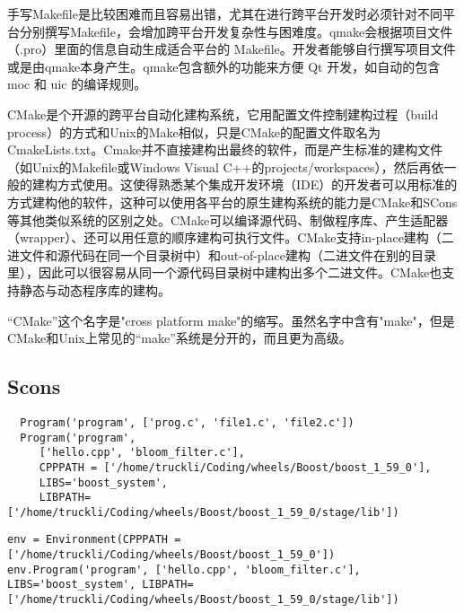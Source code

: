 手写Makefile是比较困难而且容易出错，尤其在进行跨平台开发时必须针对不同平台分别撰写Makefile，会增加跨平台开发复杂性与困难度。qmake会根据项目文件（.pro）里面的信息自动生成适合平台的 Makefile。开发者能够自行撰写项目文件或是由qmake本身产生。qmake包含额外的功能来方便 Qt 开发，如自动的包含moc 和 uic 的编译规则。

CMake是个开源的跨平台自动化建构系统，它用配置文件控制建构过程（build process）的方式和Unix的Make相似，只是CMake的配置文件取名为CmakeLists.txt。Cmake并不直接建构出最终的软件，而是产生标准的建构文件（如Unix的Makefile或Windows Visual C++的projects/workspaces），然后再依一般的建构方式使用。这使得熟悉某个集成开发环境（IDE）的开发者可以用标准的方式建构他的软件，这种可以使用各平台的原生建构系统的能力是CMake和SCons等其他类似系统的区别之处。CMake可以编译源代码、制做程序库、产生适配器（wrapper）、还可以用任意的顺序建构可执行文件。CMake支持in-place建构（二进文件和源代码在同一个目录树中）和out-of-place建构（二进文件在别的目录里），因此可以很容易从同一个源代码目录树中建构出多个二进文件。CMake也支持静态与动态程序库的建构。

“CMake”这个名字是"cross platform make"的缩写。虽然名字中含有"make"，但是CMake和Unix上常见的“make”系统是分开的，而且更为高级。



\subsection{Scons}

\begin{verbatim}
  Program('program', ['prog.c', 'file1.c', 'file2.c'])
  Program('program', 
 	 ['hello.cpp', 'bloom_filter.c'], 
 	 CPPPATH = ['/home/truckli/Coding/wheels/Boost/boost_1_59_0'],
 	 LIBS='boost_system', 
 	 LIBPATH=['/home/truckli/Coding/wheels/Boost/boost_1_59_0/stage/lib'])

\end{verbatim}

\begin{verbatim}
env = Environment(CPPPATH = ['/home/truckli/Coding/wheels/Boost/boost_1_59_0'])
env.Program('program', ['hello.cpp', 'bloom_filter.c'], LIBS='boost_system', LIBPATH=['/home/truckli/Coding/wheels/Boost/boost_1_59_0/stage/lib'])
\end{verbatim}










